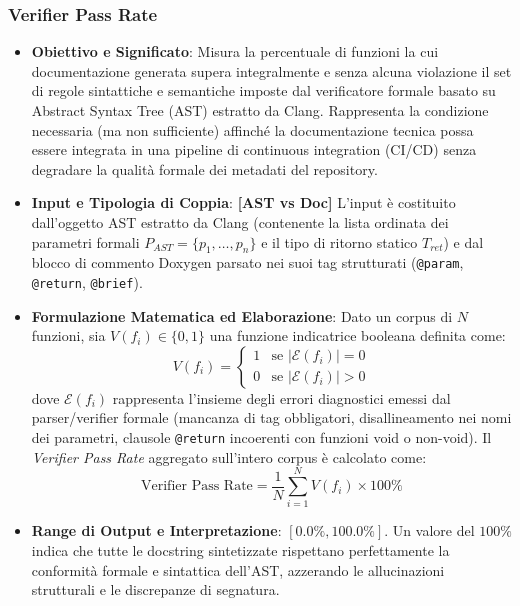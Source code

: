 \subsubsection{Verifier Pass Rate}
\label{subsubsec:verifier_pass_rate}
\begin{itemize}[leftmargin=*, label=\textbullet]
    \item \textbf{Obiettivo e Significato}: Misura la percentuale di funzioni la cui documentazione generata supera integralmente e senza alcuna violazione il set di regole sintattiche e semantiche imposte dal verificatore formale basato su Abstract Syntax Tree (AST) estratto da Clang. Rappresenta la condizione necessaria (ma non sufficiente) affinché la documentazione tecnica possa essere integrata in una pipeline di continuous integration (CI/CD) senza degradare la qualità formale dei metadati del repository.
    \item \textbf{Input e Tipologia di Coppia}: \textbf{[AST vs Doc]} L'input è costituito dall'oggetto AST estratto da Clang (contenente la lista ordinata dei parametri formali $P_{AST} = \{p_1, \dots, p_n\}$ e il tipo di ritorno statico $T_{ret}$) e dal blocco di commento Doxygen parsato nei suoi tag strutturati (\texttt{@param}, \texttt{@return}, \texttt{@brief}).
    \item \textbf{Formulazione Matematica ed Elaborazione}: Dato un corpus di $N$ funzioni, sia $V(f_i) \in \{0, 1\}$ una funzione indicatrice booleana definita come:
    \begin{equation}
        V(f_i) = \begin{cases} 
            1 & \text{se } |\mathcal{E}(f_i)| = 0 \\ 
            0 & \text{se } |\mathcal{E}(f_i)| > 0 
        \end{cases}
        \label{eq:verifier_bool}
    \end{equation}
    dove $\mathcal{E}(f_i)$ rappresenta l'insieme degli errori diagnostici emessi dal parser/verifier formale (mancanza di tag obbligatori, disallineamento nei nomi dei parametri, clausole \texttt{@return} incoerenti con funzioni void o non-void). Il \emph{Verifier Pass Rate} aggregato sull'intero corpus è calcolato come:
    \begin{equation}
        \text{Verifier Pass Rate} = \frac{1}{N} \sum_{i=1}^{N} V(f_i) \times 100\%
        \label{eq:verifier_pass_rate}
    \end{equation}
    \item \textbf{Range di Output e Interpretazione}: $[0.0\%, 100.0\%]$. Un valore del $100\%$ indica che tutte le docstring sintetizzate rispettano perfettamente la conformità formale e sintattica dell'AST, azzerando le allucinazioni strutturali e le discrepanze di segnatura.
\end{itemize}

